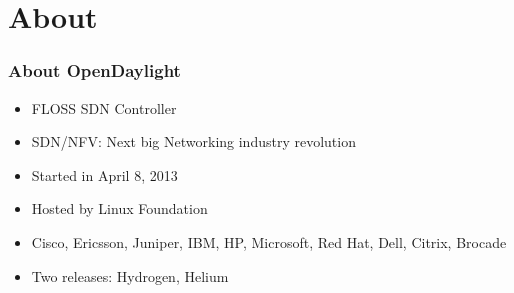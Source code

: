 \section{About}

\begin{frame}[allowframebreaks]
\frametitle{About OpenDaylight}

\begin{itemize}
	\item FLOSS SDN Controller
 \item SDN/NFV: Next big Networking industry revolution
	\item Started in April 8, 2013
	\item Hosted by Linux Foundation
	\item Cisco, Ericsson, Juniper, IBM, HP, Microsoft, Red Hat, Dell, Citrix, Brocade
	\item Two releases: Hydrogen, Helium
\end{itemize}

\end{frame}
